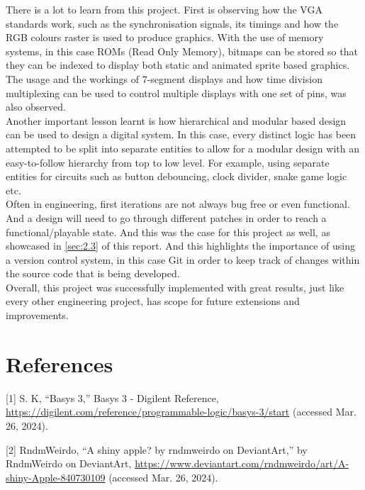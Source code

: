 \documentclass[aps, secnumarabic, balancelastpage, asmath, amssymb, nofootinbib, floatfix,]{revtex4-2}
\begin{document}
{There is a lot to learn from this project. First is observing how the VGA standards work, such as the synchronisation signals, its timings and how the RGB colours raster is used to produce graphics. With the use of memory systems, in this case ROMs (Read Only Memory), bitmaps can be stored so that they can be indexed to display both static and animated sprite based graphics. The usage and the workings of 7-segment displays and how time division multiplexing can be used to control multiple displays with one set of pins, was also observed. ~\\


Another important lesson learnt is how hierarchical and modular based design can be used to design a digital system. In this case, every distinct logic has been attempted to be split into separate entities to allow for a modular design with an easy-to-follow hierarchy from top to low level. For example, using separate entities for circuits such as button debouncing, clock divider, snake game logic etc.~\\


Often in engineering, first iterations are not always bug free or even functional. And a design will need to go through different patches in order to reach a functional/playable state. And this was the case for this project as well, as showcased in \ref{sec:2.3} of this report. And this highlights the importance of using a version control system, in this case Git in order to keep track of changes within the source code that is being developed.~\\

Overall, this project was successfully implemented with great results, just like every other engineering project, has scope for future extensions and improvements.


\clearpage


\section{\fontsize{11.3pt}{12pt}\selectfont \bf References}
\fontsize{11pt}{12pt}\selectfont \label{sec:5}

[1] S. K, ``Basys 3,'' Basys 3 - Digilent Reference, \url{https://digilent.com/reference/programmable-logic/basys-3/start} (accessed Mar. 26, 2024). 

[2] RndmWeirdo, “A shiny apple? by rndmweirdo on DeviantArt,” by RndmWeirdo on DeviantArt, \url{https://www.deviantart.com/rndmweirdo/art/A-shiny-Apple-840730109} (accessed Mar. 26, 2024). 

}
\end{document}
